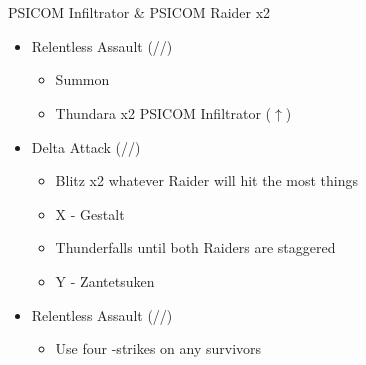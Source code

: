 \chapter[Chapter 9]{}

\renewcommand{\first}{[1] Relentless Assault (\rav/\rav/\com)}
\renewcommand{\second}{[2] Delta Attack (\com/\rav/\sen)}
\begin{battle}{PSICOM Infiltrator \& PSICOM Raider x2}
\begin{multicols}{2}
\begin{itemize}
    \item \first
    \begin{itemize}
        \item Summon
        \item Thundara x2 PSICOM Infiltrator ($\uparrow$)
    \end{itemize}
    \item \second
    \begin{itemize}
        \item Blitz x2 whatever Raider will hit the most things
        \item X - Gestalt
        \item Thunderfalls until both Raiders are staggered
        \item Y - Zantetsuken
    \end{itemize}
    \item \first
    \begin{itemize}
        \item Use four -strikes on any survivors
    \end{itemize}
\end{itemize}
\end{multicols}
  
\end{battle}
